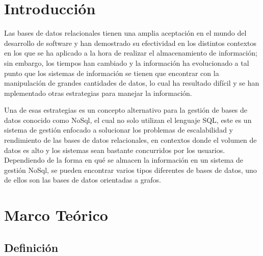 \documentclass[preprint,12pt]{elsarticle}
\begin{document}



\section{Introducción} 

Las bases de datos relacionales tienen una amplia aceptación en el mundo del desarrollo de software y han demostrado su efectividad en los distintos contextos en los que se ha aplicado a la hora de realizar el almacenamiento de información; sin embargo, los tiempos han cambiado y la información ha evolucionado a tal punto que los sistemas de información se tienen que encontrar con la manipulación de grandes cantidades de datos, lo cual ha resultado difícil y se han
 mplementado otras estrategias para manejar la información.

Una de esas estrategias es un concepto alternativo para la gestión de bases de datos conocido como NoSql, el cual no solo utilizan el lenguaje SQL, este es un sistema de gestión enfocado a solucionar los problemas de escalabilidad y rendimiento de las bases de datos relacionales, en contextos donde el volumen de datos es alto y los sistemas sean bastante concurridos por los usuarios.
Dependiendo de la forma en qué se almacen la información en un sistema de gestión NoSql, se pueden encontrar varios tipos diferentes de
bases de datos, uno de ellos son las bases de datos orientadas a grafos. 






\section{Marco Teórico}


\subsection {\textbf{Definición}}
\end{document}
